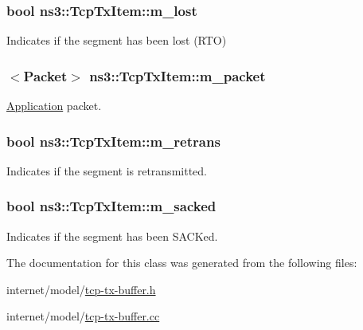\subsubsection[{\texorpdfstring{m\+\_\+lost}{m_lost}}]{\setlength{\rightskip}{0pt plus 5cm}bool ns3\+::\+Tcp\+Tx\+Item\+::m\+\_\+lost}\hypertarget{classns3_1_1TcpTxItem_ad7e543719e0aacde056350f7376dca74}{}\label{classns3_1_1TcpTxItem_ad7e543719e0aacde056350f7376dca74}


Indicates if the segment has been lost (R\+TO) 

\subsubsection[{\texorpdfstring{m\+\_\+packet}{m_packet}}]{$<${\bf Packet}$>$ ns3\+::\+Tcp\+Tx\+Item\+::m\+\_\+packet}\hypertarget{classns3_1_1TcpTxItem_addd21e6a843eb62c2e638962ea848918}{}\label{classns3_1_1TcpTxItem_addd21e6a843eb62c2e638962ea848918}


\hyperlink{classns3_1_1Application}{Application} packet. 

\subsubsection[{\texorpdfstring{m\+\_\+retrans}{m_retrans}}]{\setlength{\rightskip}{0pt plus 5cm}bool ns3\+::\+Tcp\+Tx\+Item\+::m\+\_\+retrans}\hypertarget{classns3_1_1TcpTxItem_a15fa2c24263563070aec47c52ad70050}{}\label{classns3_1_1TcpTxItem_a15fa2c24263563070aec47c52ad70050}


Indicates if the segment is retransmitted. 

\subsubsection[{\texorpdfstring{m\+\_\+sacked}{m_sacked}}]{\setlength{\rightskip}{0pt plus 5cm}bool ns3\+::\+Tcp\+Tx\+Item\+::m\+\_\+sacked}\hypertarget{classns3_1_1TcpTxItem_a07eed696a5ebcd8941ffbf515147bb14}{}\label{classns3_1_1TcpTxItem_a07eed696a5ebcd8941ffbf515147bb14}


Indicates if the segment has been S\+A\+C\+Ked. 



The documentation for this class was generated from the following files\+:\begin{DoxyCompactItemize}
\item 
internet/model/\hyperlink{tcp-tx-buffer_8h}{tcp-\/tx-\/buffer.\+h}\item 
internet/model/\hyperlink{tcp-tx-buffer_8cc}{tcp-\/tx-\/buffer.\+cc}\end{DoxyCompactItemize}

